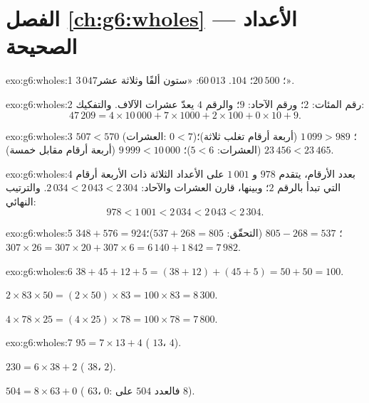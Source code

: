 \section*{الفصل \ref{ch:g6:wholes} --- الأعداد الصحيحة}

\begin{solution}{exo:g6:wholes:1}
$3\,047$؛ \quad $20\,500$؛ \quad $104$. \quad
$60\,013$: «ستون ألفًا وثلاثة عشر».
\end{solution}

\begin{solution}{exo:g6:wholes:2}
رقم المئات: $2$؛ ورقم الآحاد: $9$؛ والرقم $4$ يعدّ
عشرات الآلاف. والتفكيك:
\[
47\,209 = 4 \times 10\,000 + 7 \times 1000 + 2 \times 100 + 0 \times 10
+ 9 .
\]
\end{solution}

\begin{solution}{exo:g6:wholes:3}
$507 < 570$ (العشرات: $0 < 7$)؛ \quad
$1\,099 > 989$ (أربعة أرقام تغلب ثلاثة)؛ \quad
$23\,456 < 23\,465$ (العشرات: $5 < 6$)؛ \quad
$9\,999 < 10\,000$ (أربعة أرقام مقابل خمسة).
\end{solution}

\begin{solution}{exo:g6:wholes:4}
بعدد الأرقام، يتقدم $978$ و $1\,001$ على الأعداد الثلاثة
ذات الأربعة أرقام التي تبدأ بالرقم $2$؛ وبينها، قارن العشرات
والآحاد: $2\,034 < 2\,043 < 2\,304$. والترتيب النهائي:
\[
978 < 1\,001 < 2\,034 < 2\,043 < 2\,304 .
\]
\end{solution}

\begin{solution}{exo:g6:wholes:5}
$348 + 576 = 924$؛ \quad $805 - 268 = 537$ (التحقّق:
$537 + 268 = 805$)؛ \quad $307 \times 26 = 307 \times 20 + 307 \times 6
= 6\,140 + 1\,842 = 7\,982$.
\end{solution}

\begin{solution}{exo:g6:wholes:6}
$38 + 45 + 12 + 5 = (38 + 12) + (45 + 5) = 50 + 50 = 100$.

$2 \times 83 \times 50 = (2 \times 50) \times 83 = 100 \times 83 =
8\,300$.

$4 \times 78 \times 25 = (4 \times 25) \times 78 = 100 \times 78 =
7\,800$.
\end{solution}

\begin{solution}{exo:g6:wholes:7}
$95 = 7 \times 13 + 4$ ( $13$،  $4$).

$230 = 6 \times 38 + 2$ ( $38$،  $2$).

$504 = 8 \times 63 + 0$ ( $63$،  $0$: فالعدد $504$
 على $8$).
\end{solution}

